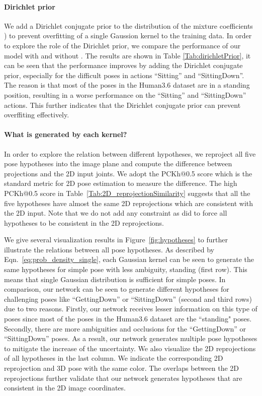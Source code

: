 \documentclass[10pt,twocolumn,letterpaper]{article}
\begin{document}
\paragraph{Dirichlet prior}
We add a Dirichlet conjugate prior to the distribution of the mixture coefficients ) to prevent overfitting of a single Gaussion kernel to the training data. In order to explore the role of the Dirichlet prior, we compare the performance of our model with and without . The results are shown in Table \ref{Tab:dirichletPrior}, it can be seen that the performance improves by adding the Dirichlet conjugate prior, especially for the difficult poses in actions ``Sitting'' and ``SittingDown''. The reason is that most of the poses in the Human3.6 dataset are in a standing position, resulting in a worse performance on the  ``Sitting'' and ``SittingDown'' actions. This further indicates that the Dirichlet conjugate prior can prevent overffiting effectively.
\vspace{-2mm}
\paragraph{What is generated by each kernel?}
In order to explore the relation between different hypotheses, we reproject all five pose hypotheses into the image plane and compute the difference between projections and the 2D input joints. We adopt the PCKh@0.5 score \cite{newell2016stacked} which is the standard metric for 2D pose estimation to measure the difference. The high PCKh@0.5 score in Table~\ref{Tab:2D_reprojectionSimilarity} suggests that all the five hypotheses have almost the same 2D reprojections which are consistent with the 2D input. Note that we do not add any constraint as \cite{jahangiri2017generating} did to force all hypotheses to be consistent in the 2D reprojections.  

We give several visualization results in Figure~\ref{fig:hypotheses} to further illustrate the relations between all pose hypotheses. 
As described by Eqn.~\eqref{eq:prob_density_single},
each Gaussian kernel can be seen to generate the same hypotheses
for simple pose with less ambiguity, \eg standing (first row).
This means that single Gaussian distribution is sufficient for simple poses. In comparison, our network can be seen to generate different hypotheses for challenging poses like ``GettingDown'' or ``SittingDown'' (second and third rows) due to two reasons. Firstly, our network receives lesser information on this type of poses since most of the poses in the Human3.6 dataset are the ``standing" poses. Secondly, there are more ambiguities and occlusions for the ``GettingDown'' or ``SittingDown'' poses. As a result, our network generates multiple pose hypotheses to mitigate the increase of the uncertainty.
We also visualize the 2D reprojections of all hypotheses in the last column. We indicate the corresponding 2D reprojection and 3D pose with the same color. 
The overlaps between the 2D reprojections further validate that our network generates hypotheses that are consistent in the 2D image coordinates.
\end{document}
